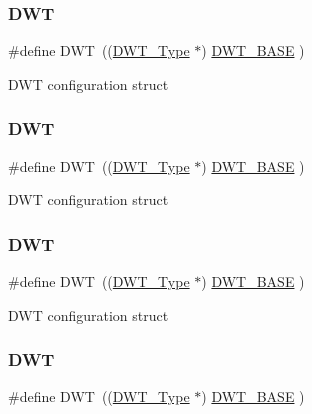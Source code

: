 \subsubsection{\texorpdfstring{D\+WT}{DWT}\hspace{0.1cm}{\footnotesize\ttfamily [2/8]}}
{\footnotesize\ttfamily \#define D\+WT~((\hyperlink{struct_d_w_t___type}{D\+W\+T\+\_\+\+Type}       $\ast$)     \hyperlink{group___c_m_s_i_s__core__base_gafdab534f961bf8935eb456cb7700dcd2}{D\+W\+T\+\_\+\+B\+A\+SE}         )}

D\+WT configuration struct \mbox{\label{group___c_m_s_i_s__core__base_gabbe5a060185e1d5afa3f85b14e10a6ce}} 
\subsubsection{\texorpdfstring{D\+WT}{DWT}\hspace{0.1cm}{\footnotesize\ttfamily [3/8]}}
{\footnotesize\ttfamily \#define D\+WT~((\hyperlink{struct_d_w_t___type}{D\+W\+T\+\_\+\+Type}       $\ast$)     \hyperlink{group___c_m_s_i_s__core__base_gafdab534f961bf8935eb456cb7700dcd2}{D\+W\+T\+\_\+\+B\+A\+SE}      )}

D\+WT configuration struct \mbox{\label{group___c_m_s_i_s__core__base_gabbe5a060185e1d5afa3f85b14e10a6ce}} 
\subsubsection{\texorpdfstring{D\+WT}{DWT}\hspace{0.1cm}{\footnotesize\ttfamily [4/8]}}
{\footnotesize\ttfamily \#define D\+WT~((\hyperlink{struct_d_w_t___type}{D\+W\+T\+\_\+\+Type}       $\ast$)     \hyperlink{group___c_m_s_i_s__core__base_gafdab534f961bf8935eb456cb7700dcd2}{D\+W\+T\+\_\+\+B\+A\+SE}      )}

D\+WT configuration struct \mbox{\label{group___c_m_s_i_s__core__base_gabbe5a060185e1d5afa3f85b14e10a6ce}} 
\subsubsection{\texorpdfstring{D\+WT}{DWT}\hspace{0.1cm}{\footnotesize\ttfamily [5/8]}}
{\footnotesize\ttfamily \#define D\+WT~((\hyperlink{struct_d_w_t___type}{D\+W\+T\+\_\+\+Type}       $\ast$)     \hyperlink{group___c_m_s_i_s__core__base_gafdab534f961bf8935eb456cb7700dcd2}{D\+W\+T\+\_\+\+B\+A\+SE}      )}

